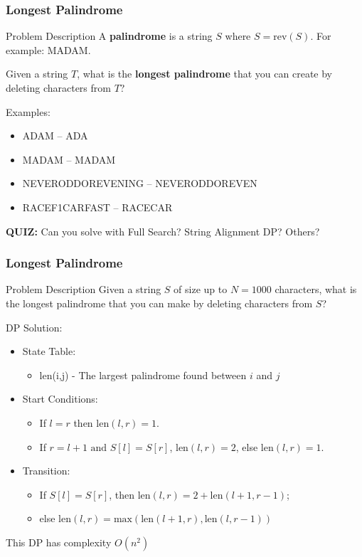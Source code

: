 \begin{frame}
  \frametitle{Longest Palindrome}
    \begin{block}{Problem Description}
      A {\bf palindrome} is a string $S$ where $S = \text{rev}(S)$. For example: MADAM.\bigskip

      Given a string $T$, what is the {\bf longest palindrome} that you can create by deleting characters from $T$?
    \end{block}

    Examples:
    \begin{itemize}
    \item ADA\alert{M} -- ADA
    \item MADAM -- MADAM
    \item NEVERODDOREVEN\alert{ING} -- NEVERODDOREVEN
    \item RACE\alert{F1}CAR\alert{FAST} -- RACECAR
    \end{itemize}\bigskip

    {\bf QUIZ:} Can you solve with Full Search? String Alignment DP? Others?
  \end{frame}

\begin{frame}
  \frametitle{Longest Palindrome}
    \begin{block}{Problem Description}
      Given a string $S$ of size up to $N = 1000$ characters, what is the
      longest palindrome that you can make by deleting characters from $S$?
    \end{block}

    DP Solution:
    \begin{itemize}
    \item State Table:
      {\smaller
      \begin{itemize}
      \item len(i,j) - The largest palindrome found between $i$ and $j$
      \end{itemize}}
    \item Start Conditions:
      {\smaller
      \begin{itemize}
        \item If $l=r$ then len$(l,r)=1$.
        \item If $r=l+1 \text{ and } S[l]=S[r]$, len$(l,r)=2$, else len$(l,r)=1$.
      \end{itemize}}
    \item Transition:
      {\smaller
      \begin{itemize}
        \item If $S[l]=S[r]$, then len$(l,r)=2+\text{len}(l+1,r-1)$;
        \item else $\text{len}(l,r) = \text{max}(\text{len}(l+1,r),\text{len}(l,r-1))$
      \end{itemize}}
    \end{itemize}

    This DP has complexity $O(n^2)$
\end{frame}

